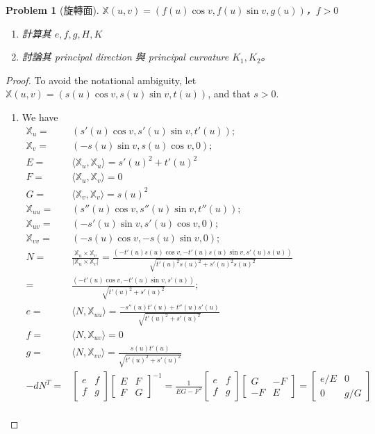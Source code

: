 \documentclass[10pt,a4paper]{article}
\newcounter{theProblemCounter}
\newtheorem{problem}[theProblemCounter]{Problem}
\begin{document}
\setcounter{theProblemCounter}{8}
\begin{problem}[旋轉面]
$\mathbb{X}(u, v)=(f(u)\cos v, f(u)\sin v, g(u))$，$f>0$ \begin{enumerate}
\item[(a)] 計算其 $e, f, g, H, K$
\item[(b)] 討論其 principal direction 與 principal curvature $K_1, K_2$。
\end{enumerate}
\end{problem}
\begin{proof}
To avoid the notational ambiguity, let $\mathbb{X}(u, v)=(s(u)\cos v, s(u)\sin v, t(u))$, and that $s>0$. \begin{enumerate}
\item[(a)] We have
\begin{align*}
\mathbb{X}_u =& (s'(u)\cos v, s'(u)\sin v, t'(u)); \\
\mathbb{X}_v =& (-s(u)\sin v, s(u)\cos v, 0); \\
E =& \langle \mathbb{X}_u, \mathbb{X}_u\rangle = s'(u)^2 + t'(u)^2 \\
F =& \langle \mathbb{X}_u, \mathbb{X}_v\rangle = 0 \\
G =& \langle \mathbb{X}_v, \mathbb{X}_v\rangle = s(u)^2 \\
\mathbb{X}_{uu} =& (s''(u)\cos v, s''(u)\sin v, t''(u)); \\
\mathbb{X}_{uv} =& (-s'(u)\sin v, s'(u)\cos v, 0); \\
\mathbb{X}_{vv} =& (-s(u)\cos v, -s(u)\sin v, 0); \\
N =& \frac{\mathbb{X}_u \times \mathbb{X}_v}{|\mathbb{X}_u \times \mathbb{X}_v|} = \frac{(-t'(u)s(u)\cos v, -t'(u)s(u)\sin v, s'(u)s(u))}{\sqrt{t'(u)^2s(u)^2 + s'(u)^2s(u)^2}} \\
  =& \frac{(-t'(u)\cos v, -t'(u)\sin v, s'(u))}{\sqrt{t'(u)^2 + s'(u)^2}}; \\
e =& \langle N, \mathbb{X}_{uu}\rangle = \frac{-s''(u)t'(u) + t''(u)s'(u)}{\sqrt{t'(u)^2 + s'(u)^2}} \\
f =& \langle N, \mathbb{X}_{uv}\rangle = 0 \\
g =& \langle N, \mathbb{X}_{vv}\rangle = \frac{s(u)t'(u)}{\sqrt{t'(u)^2 + s'(u)^2}} \\
-dN^T =& \left[\begin{array}{cc}e & f \\ f & g\end{array}\right]\left[\begin{array}{cc}E & F \\ F & G\end{array}\right]^{-1} = \frac 1{EG - F^2}\left[\begin{array}{cc}e & f \\ f & g\end{array}\right]\left[\begin{array}{cc}G & -F \\ -F & E\end{array}\right] = \left[\begin{array}{cc}e/E & 0 \\ 0 & g/G\end{array}\right]\\

\end{align*}
\end{enumerate}
\end{proof}
\end{document}
